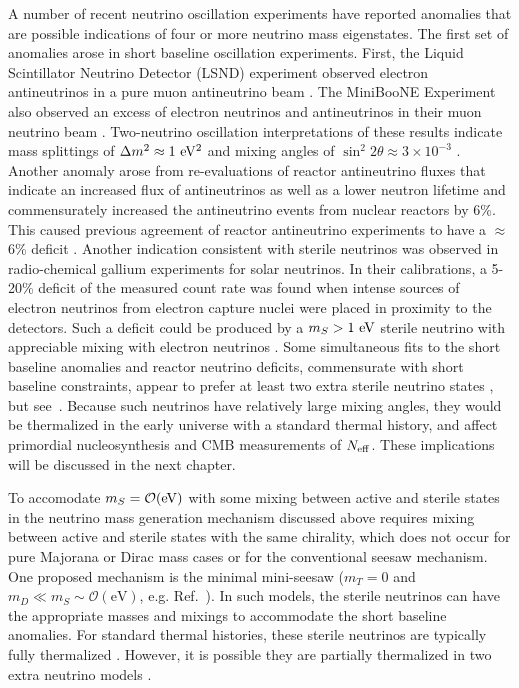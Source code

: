 A number of recent neutrino oscillation experiments have reported anomalies
that are possible indications of four or more neutrino mass eigenstates. The
first set of anomalies arose in short baseline oscillation experiments.
First, the Liquid Scintillator Neutrino Detector (LSND) experiment observed
electron antineutrinos in a pure muon antineutrino
beam \cite{Athanassopoulos:1997pv}. The MiniBooNE Experiment also observed
an excess of electron neutrinos and antineutrinos in their muon
neutrino beam \cite{Aguilar-Arevalo:2013pmq}. Two-neutrino oscillation
interpretations of these results indicate mass splittings of $\Delta m^2
\approx 1\rm\ eV^2$ and mixing angles of $\sin^2 2\theta \approx
3\times 10^{-3}$ \cite{Aguilar-Arevalo:2013pmq}. Another anomaly
arose from re-evaluations of reactor antineutrino fluxes that
indicate an increased flux of antineutrinos as well as a lower
neutron lifetime and commensurately increased the antineutrino events
from nuclear reactors by 6\%. This caused previous agreement of
reactor antineutrino experiments to have a $\approx$6\% deficit
\cite{Mention:2011rk,Huber:2011wv}. Another indication consistent with
sterile neutrinos was observed in radio-chemical gallium experiments for solar
neutrinos. In their calibrations, a 5-20\% deficit of the measured
count rate was found when intense sources of electron neutrinos from
electron capture nuclei were placed in proximity to the
detectors. Such a deficit could be produced by a $m_S >1\rm\ eV$ sterile
neutrino with appreciable mixing with electron neutrinos
\cite{Bahcall:1994bq,Giunti:2010zu}. Some simultaneous fits to the
short baseline anomalies and reactor neutrino deficits, commensurate
with short baseline constraints, appear to prefer at least two extra
sterile neutrino states \cite{Conrad:2012qt,Kopp:2013vaa}, but see~\cite{Giunti:2015mwa}. Because such neutrinos have relatively
large mixing angles, they would be thermalized in the early universe
with a standard thermal history, and affect primordial nucleosynthesis
\cite{Abazajian:2002bj} and CMB measurements of $N_{\rm eff}$.  These implications will be discussed in the next chapter.

To accomodate $m_S = \mathcal{O}({\rm eV})$ with some mixing between active
and sterile states in the neutrino mass generation mechanism discussed
above requires mixing between active and sterile states with the same
chirality, which does not occur for pure Majorana or Dirac mass cases
or for the conventional seesaw mechanism. One proposed mechanism is
the minimal mini-seesaw ($m_T =0$ and $m_D\ll
m_S\sim\mathcal{O}(\mathrm{eV})$,
e.g. Ref.~\cite{deGouvea:2011zz,Donini:2012tt}). In such models, the
sterile neutrinos can have the appropriate masses and mixings to
accommodate the short baseline anomalies. For standard thermal
histories, these sterile neutrinos are typically fully thermalized
\cite{Abazajian:2002bj}. However, it is possible they are partially
thermalized in two extra neutrino models \cite{Jacques:2013xr}.

